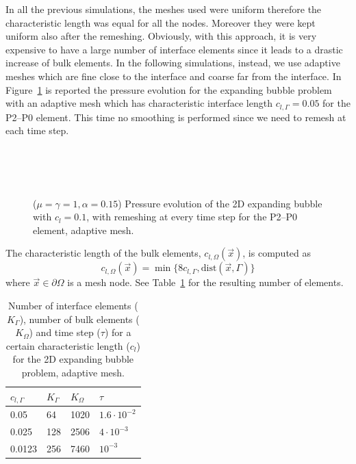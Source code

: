 \documentclass[a4paper,12pt,onecolumn]{article}
\begin{document}
In all the previous simulations, the meshes used were uniform therefore the characteristic length was equal for all the nodes. Moreover they were kept uniform also after the remeshing. Obviously, with this approach, it is very expensive to have a large number of interface elements since it leads to a drastic increase of bulk elements. In the following simulations, instead, we use adaptive meshes which are fine close to the interface and coarse far from the interface. In Figure~\ref{fig:expanding_bubble_adaptive} is reported the pressure evolution for the expanding bubble problem with an adaptive mesh which has characteristic interface length $c_{l,\Gamma}=0.05$ for the P2--P0 element. This time no smoothing is performed since we need to remesh at each time step.
\begin{figure}[htbp]
  \centering
  \\
  \quad
  \\
  \quad
  \\
  \caption{($\mu=\gamma=1,\alpha = 0.15$) Pressure evolution of the 2D expanding bubble with $c_l=0.1$, with remeshing at every time step for the P2--P0 element, adaptive mesh.}
  \label{fig:expanding_bubble_adaptive}
\end{figure}

The characteristic length of the bulk elements, $c_{l,\Omega}(\vec{x})$, is computed as
\begin{equation}\label{eq:adaptive_criteria}
 c_{l,\Omega}(\vec{x})=\min\big\{8c_{l,\Gamma},\textrm{dist}(\vec{x},\Gamma)\big\}
\end{equation}
where $\vec{x}\in\partial\Omega$ is a mesh node. See Table~\ref{tab:expandingbubble2Delements_adaptive} for the resulting number of elements. 
\begin{table}
 \center
\begin{tabular}{llll}
\hline
$c_{l,\Gamma}$ & $K_\Gamma$ & $K_\Omega$ & $\tau$ \\
\hline
0.05 & 64 & 1020 & $1.6\cdot10^{-2}$ \\
0.025 & 128 & 2506 & $4\cdot10^{-3}$\\
0.0123 & 256 & 7460 & $10^{-3}$\\
\hline
\end{tabular}
\caption{Number of interface elements ($K_\Gamma$), number of bulk elements ($K_\Omega$) and time step ($\tau$) for a certain characteristic length ($c_l$) for the 2D expanding bubble problem, adaptive mesh.}
\label{tab:expandingbubble2Delements_adaptive}
\end{table}
\end{document}
